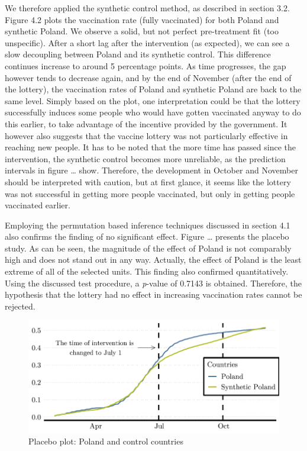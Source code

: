 \documentclass{scrbook}
\begin{document}
We therefore applied the synthetic control method, as described in
section 3.2. Figure 4.2 plots the vaccination rate (fully vaccinated)
for both Poland and synthetic Poland. We observe a solid, but not
perfect pre-treatment fit (too unspecific). After a short lag after the
intervention (as expected), we can see a slow decoupling between Poland
and its synthetic control. This difference continues increase to around
5 percentage points. As time progresses, the gap however tends to
decrease again, and by the end of November (after the end of the
lottery), the vaccination rates of Poland and synthetic Poland are back
to the same level. Simply based on the plot, one interpretation could be
that the lottery successfully induces some people who would have gotten
vaccinated anyway to do this earlier, to take advantage of the incentive
provided by the government. It however also suggests that the vaccine
lottery was not particularly effective in reaching new people. It has to
be noted that the more time has passed since the intervention, the
synthetic control becomes more unreliable, as the prediction intervals
in figure \ldots{} show. Therefore, the development in October and
November should be interpreted with caution, but at first glance, it
seems like the lottery was not successful in getting more people
vaccinated, but only in getting people vaccinated earlier.

Employing the permutation based inference techniques discussed in
section 4.1 also confirms the finding of no significant effect. Figure
\ldots{} presents the placebo study. As can be seen, the magnitude of
the effect of Poland is not comparably high and does not stand out in
any way. Actually, the effect of Poland is the least extreme of all of
the selected units. This finding also confirmed quantitatively. Using
the discussed test procedure, a \textit{p}-value of 0.7143 is obtained.
Therefore, the hypothesis that the lottery had no effect in increasing
vaccination rates cannot be rejected.

\begin{figure}[h]
\caption{Placebo plot: Poland and control countries}

\begin{center}\includegraphics{bachelor_thesis_files/figure-latex/unnamed-chunk-5-1} \end{center}
\end{figure}
\end{document}

